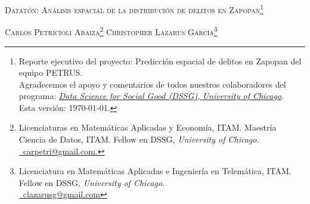 \thispagestyle{plain}
\begin{center}
\scshape \Large Datatón: Análisis espacial de la distribución  de delitos en Zapopan\footnote{Reporte ejecutivo del proyecto: Predicción espacial de delitos en Zapopan del equipo PETRUS.
\\ Agradecemos el apoyo y comentarios de todos nuestros colaboradores del programa: \href{http://dssg.uchicago.edu}{\textit{Data Science for Social Good (DSSG)}, \textit{University of Chicago}}.
\\ Esta versión: \today.}

\bigskip
\large \scshape Carlos Petricioli Araiza\footnote{Licenciaturas en Matemáticas Aplicadas y Economía, ITAM. Maestría Ciencia de Datos, ITAM. Fellow en DSSG, \textit{University of Chicago}.  \\ \href{mailto:carpetri@gmail.com}{\Letter \ carpetri@gmail.com.} }  \hfill Christopher Lazarus García\footnote{Licenciatura en Matemáticas Aplicadas e Ingeniería en Telemática, ITAM. Fellow en DSSG, \textit{University of Chicago}.\\ \href{mailto:clazarusg@gmail.com}{\Letter \ clazarusg@gmail.com} } 
\normalsize
\end{center}

\bigskip
